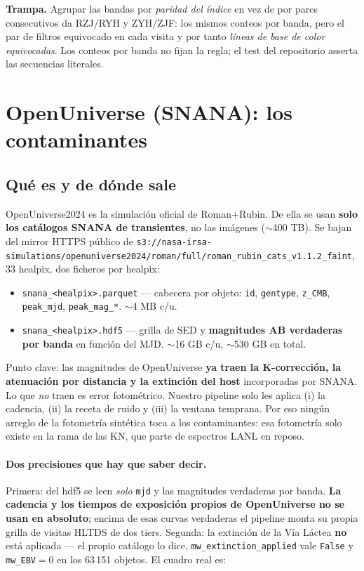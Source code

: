 \documentclass[11pt,a4paper]{article}
\newcommand{\code}[1]{\texttt{\small #1}}
\newlength{\examenpad}
\newenvironment{examen}
  {\par\medskip\noindent
   \begin{lrbox}{\examenbox}%
   \begin{minipage}{\dimexpr\linewidth-2\examenpad}\small}
  {\end{minipage}%
   \end{lrbox}%
   {\setlength{\fboxsep}{\examenpad}\colorbox{boxgray}{\usebox{\examenbox}}}%
   \par\medskip}
\begin{document}
\begin{examen}
\textbf{Trampa.} Agrupar las bandas por \emph{paridad del índice} en vez de por pares consecutivos
da RZJ/RYH y ZYH/ZJF: los mismos conteos por banda, pero el par de filtros equivocado en cada
visita y por tanto \emph{líneas de base de color equivocadas}. Los conteos por banda no fijan la
regla; el test del repositorio asserta las secuencias literales.
\end{examen}

\section{OpenUniverse (SNANA): los contaminantes}

\subsection{Qué es y de dónde sale}
OpenUniverse2024 es la simulación oficial de Roman$+$Rubin. De ella se usan \textbf{solo los
catálogos SNANA de transientes}, no las imágenes ($\sim$400 TB). Se bajan del mirror HTTPS público
de \code{s3://nasa-irsa-simulations/openuniverse2024/roman/full/roman\_rubin\_cats\_v1.1.2\_faint},
33 healpix, dos ficheros por healpix:
\begin{itemize}[nosep]
  \item \code{snana\_<healpix>.parquet} --- cabecera por objeto: \code{id}, \code{gentype},
        \code{z\_CMB}, \code{peak\_mjd}, \code{peak\_mag\_*}. $\sim$4 MB c/u.
  \item \code{snana\_<healpix>.hdf5} --- grilla de SED y \textbf{magnitudes AB verdaderas por banda}
        en función del MJD. $\sim$16 GB c/u, $\sim$530 GB en total.
\end{itemize}

Punto clave: las magnitudes de OpenUniverse \textbf{ya traen la K-corrección, la atenuación por
distancia y la extinción del host} incorporadas por SNANA. Lo que \emph{no} traen es error
fotométrico. Nuestro pipeline solo les aplica (i) la cadencia, (ii) la receta de ruido y (iii) la
ventana temprana. Por eso ningún arreglo de la fotometría sintética toca a los contaminantes: esa
fotometría solo existe en la rama de las KN, que parte de espectros LANL en reposo.

\paragraph{Dos precisiones que hay que saber decir.} Primera: del hdf5 se leen \emph{solo}
\code{mjd} y las magnitudes verdaderas por banda. \textbf{La cadencia y los tiempos de exposición
propios de OpenUniverse no se usan en absoluto}; encima de esas curvas verdaderas el pipeline monta
su propia grilla de visitas HLTDS de dos tiers. Segunda: la extinción de la Vía Láctea \textbf{no}
está aplicada --- el propio catálogo lo dice, \code{mw\_extinction\_applied} vale \code{False} y
\code{mw\_EBV}$=0$ en los 63\,151 objetos. El cuadro real es:
\end{document}
